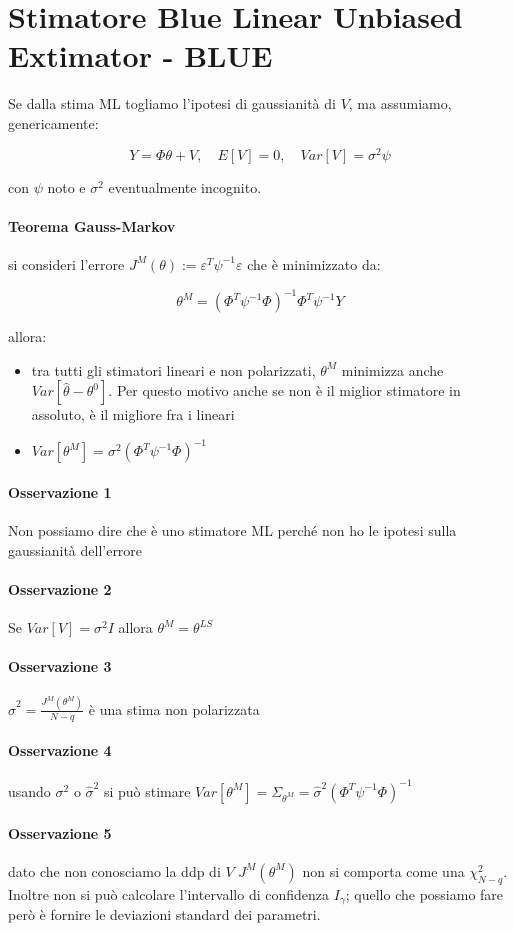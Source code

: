 \section{Stimatore Blue Linear Unbiased Extimator - BLUE}
Se dalla stima ML togliamo l'ipotesi di gaussianità di $V$, ma assumiamo, genericamente:

    \[ Y=\Phi\theta+V, \quad  E[V]=0, \quad Var[V]=\sigma^2\psi \]

con $\psi$ noto e $\sigma^2$ eventualmente incognito.
\paragraph{Teorema Gauss-Markov} si consideri l'errore $J^M(\theta):=\varepsilon^T\psi^{-1}\varepsilon$ che è minimizzato da:

  \[ \theta^M=(\Phi^T\psi^{-1}\Phi)^{-1}\Phi^T\psi^{-1}Y \]
  
allora:
\begin{itemize}
  \item tra tutti gli stimatori lineari e non polarizzati, $\theta^M$ minimizza anche $Var[\hat{\theta}-\theta^0]$. Per questo motivo anche se non è il miglior stimatore in assoluto, è il migliore fra i lineari
  \item $Var[\theta^M]=\sigma^2(\Phi^T\psi^{-1}\Phi)^{-1}$
\end{itemize}
\paragraph{Osservazione 1} Non possiamo dire che è uno stimatore ML perché non ho le ipotesi sulla gaussianità dell'errore
\paragraph{Osservazione 2} Se $Var[V]=\sigma^2I$ allora $\theta^M=\theta^{LS}$
\paragraph{Osservazione 3} $\hat{\sigma}^2=\frac{J^M(\theta^M)}{N-q}$ è una stima non polarizzata
\paragraph{Osservazione 4} usando $\sigma^2$ o $\hat{\sigma}^2$ si può stimare $Var[\theta^M]=\Sigma_{\theta^M}=\hat{\sigma}^2(\Phi^T\psi^{-1}\Phi)^{-1}$
\paragraph{Osservazione 5} dato che non conosciamo la ddp di $V$ $J^M(\theta^M)$ non si comporta come una $\chi_{N-q}^2$. Inoltre non si può calcolare l'intervallo di confidenza $I_\gamma$; quello che possiamo fare però è fornire le deviazioni standard dei parametri.
